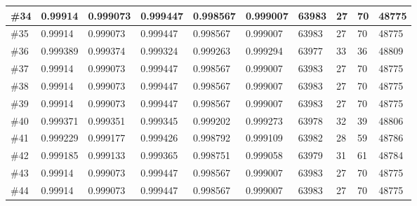 \begin{longtable}{l|l|l|l|l|l|l|l|l|l}
\#34 & 0.99914  & 0.999073 & 0.999447 & 0.998567 & 0.999007 & 63983 & 27  & 70  & 48775 \\ \hline
\#35 & 0.99914  & 0.999073 & 0.999447 & 0.998567 & 0.999007 & 63983 & 27  & 70  & 48775 \\ \hline
\#36 & 0.999389 & 0.999374 & 0.999324 & 0.999263 & 0.999294 & 63977 & 33  & 36  & 48809 \\ \hline
\#37 & 0.99914  & 0.999073 & 0.999447 & 0.998567 & 0.999007 & 63983 & 27  & 70  & 48775 \\ \hline
\#38 & 0.99914  & 0.999073 & 0.999447 & 0.998567 & 0.999007 & 63983 & 27  & 70  & 48775 \\ \hline
\#39 & 0.99914  & 0.999073 & 0.999447 & 0.998567 & 0.999007 & 63983 & 27  & 70  & 48775 \\ \hline
\#40 & 0.999371 & 0.999351 & 0.999345 & 0.999202 & 0.999273 & 63978 & 32  & 39  & 48806 \\ \hline
\#41 & 0.999229 & 0.999177 & 0.999426 & 0.998792 & 0.999109 & 63982 & 28  & 59  & 48786 \\ \hline
\#42 & 0.999185 & 0.999133 & 0.999365 & 0.998751 & 0.999058 & 63979 & 31  & 61  & 48784 \\ \hline
\#43 & 0.99914  & 0.999073 & 0.999447 & 0.998567 & 0.999007 & 63983 & 27  & 70  & 48775 \\ \hline
\#44 & 0.99914  & 0.999073 & 0.999447 & 0.998567 & 0.999007 & 63983 & 27  & 70  & 48775 \\ \hline



\end{longtable}













